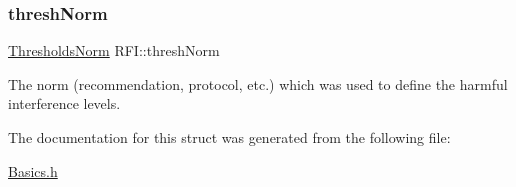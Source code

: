\subsubsection{\texorpdfstring{thresh\+Norm}{threshNorm}}
{\footnotesize\ttfamily \hyperlink{structRFI_a18cfa7d24274bbcd14acc6b513860cb0}{Thresholds\+Norm} R\+F\+I\+::thresh\+Norm}

The norm (recommendation, protocol, etc.) which was used to define the harmful interference levels. 

The documentation for this struct was generated from the following file\+:\begin{DoxyCompactItemize}
\item 
\hyperlink{Basics_8h}{Basics.\+h}\end{DoxyCompactItemize}
